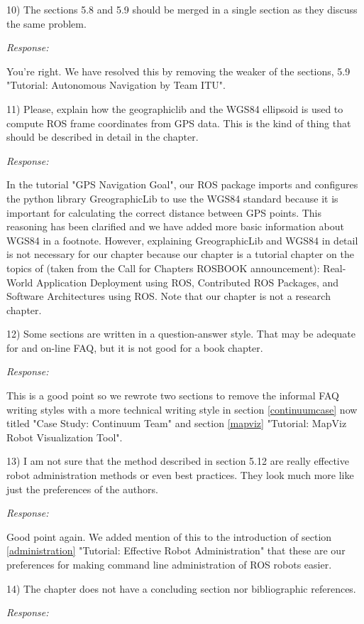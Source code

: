 \documentclass[runningheads,a4paper]{llncs}
\newcommand{\rsp}{\noindent \textit{Response:}}
\begin{document}
10)  The sections 5.8 and 5.9 should be merged in a single section as they discuss the same problem.

\rsp

You're right. We have resolved this by removing the weaker of the sections, 5.9 "Tutorial: Autonomous Navigation by Team ITU".

11)  Please, explain how the geographiclib and the WGS84 ellipsoid is used to compute ROS frame coordinates from GPS data.  This is the kind of thing that should be described in detail in the chapter.

\rsp

In the tutorial "GPS Navigation Goal", our ROS package imports and configures the python library GreographicLib to use the WGS84 standard because it is important for calculating the correct distance between GPS points. This reasoning has been clarified and we have added more basic information about WGS84 in a footnote. However, explaining GreographicLib and WGS84 in detail is not necessary for our chapter because our chapter is a tutorial chapter on the topics of (taken from the Call for Chapters ROSBOOK announcement): Real-World Application Deployment using ROS, Contributed ROS Packages, and Software Architectures using ROS. Note that our chapter is not a research chapter.

12) Some sections are written in a question-answer style. That may be adequate for and on-line FAQ, but it is not good for a book chapter.

\rsp

This is a good point so we rewrote two sections to remove the informal FAQ writing styles with a more technical writing style in section \ref{continuumcase} now titled "Case Study: Continuum Team" and section \ref{mapviz} "Tutorial: MapViz Robot Visualization Tool". 

13) I am not sure that the method described in section 5.12 are really effective robot administration methods or even best practices. They look much more like just the preferences of the authors.

\rsp

Good point again. We added mention of this to the introduction of section \ref{administration} "Tutorial: Effective Robot Administration" that these are our preferences for making command line administration of ROS robots easier.

14) The chapter does not have a concluding section nor bibliographic references. 

\rsp
\end{document}
